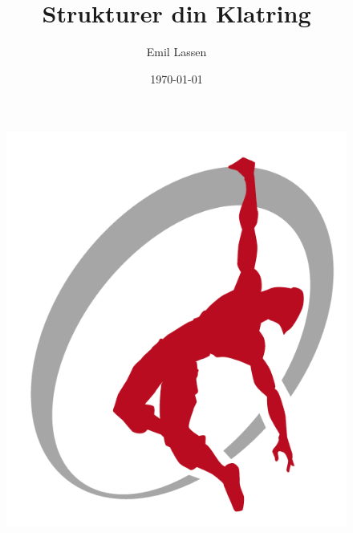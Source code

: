 \documentclass[14pt]{extarticle}
\title{\sc Strukturer din Klatring}
\author{Emil Lassen}
\date{\today}
\begin{document}
\maketitle
\vfill
\begin{figure}[h!]
  \raggedleft
  \includegraphics[width=.6\textwidth]{figs/aak}
\end{figure}
\clearpage


\clearpage


\clearpage


\clearpage


\clearpage


\clearpage


\end{document}
